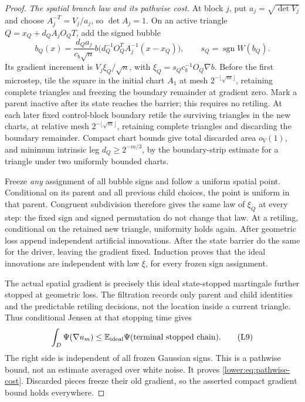 \documentclass[11pt]{article}
\newcommand{\E}{\mathbb E}
\numberwithin{equation}{section}
\begin{document}
\begin{proof}
\emph{The spatial branch law and its pathwise cost.}
At block \(j\), put \(a_j=\sqrt{\det V_j}\) and choose
\(A_j^{-T}=V_j/a_j\), so \(\det A_j=1\).  On an active triangle
\(Q=x_Q+d_QA_jO_QT\), add the signed bubble
\[
 b_Q(x)=\frac{d_Qa_j}{c_b\sqrt n}
 b\big(d_Q^{-1}O_Q^TA_j^{-1}(x-x_Q)\big),
 \qquad s_Q=\operatorname{sgn}W(b_Q).
 \tag{L8}\label{lower:eq:bubble}
\]
Its gradient increment is \(V_j\xi_Q/\sqrt n\), with
\(\xi_Q=s_Qc_b^{-1}O_Q\nabla b\). Before the first microstep, tile
the square in the initial chart \(A_1\) at mesh
\(2^{-\lfloor\sqrt m\rfloor}\), retaining complete triangles and
freezing the boundary remainder at gradient zero. Mark a parent
inactive after its state reaches the barrier; this requires no
retiling. At each later fixed control-block boundary retile the
surviving triangles in the new charts, at relative mesh
\(2^{-\lfloor\sqrt m\rfloor}\), retaining complete triangles and
discarding the boundary remainder. Compact
chart bounds give total discarded area \(o_V(1)\), and minimum
intrinsic leg \(d_Q\ge2^{-m/3}\), by the boundary-strip estimate for a triangle under two uniformly bounded charts.

Freeze \emph{any} assignment of all bubble signs and follow a uniform
spatial point.  Conditional on its parent and all previous child
choices, the point is uniform in that parent.  Congruent subdivision
therefore gives the same law of \(\xi_Q\) at every step: the fixed
sign and signed permutation do not change that law.  At a retiling,
conditional on the retained new triangle, uniformity holds again.
After geometric loss append independent artificial innovations.
After the state barrier do the same for the driver, leaving the
gradient fixed.  Induction proves that the ideal innovations are
independent with law \(\xi\), for every frozen sign assignment.

The actual spatial gradient is precisely this ideal state-stopped
martingale further stopped at geometric loss.  The filtration records
only parent and child identities and the predictable retiling decisions,
not the location inside a current triangle.  Thus conditional Jensen
at that stopping time gives
\[
 \int_D\Psi(\nabla u_m)
   \le\E_{\rm ideal}\Psi(\text{terminal stopped chain}).
 \tag{L9}\label{lower:eq:jensen}
\]
The right side is independent of all frozen Gaussian signs.  This is
a pathwise bound, not an estimate averaged over white noise.  It proves
\eqref{lower:eq:pathwise-cost}.  Discarded pieces freeze their old
gradient, so the asserted compact gradient bound holds everywhere.


\end{proof}
\end{document}
